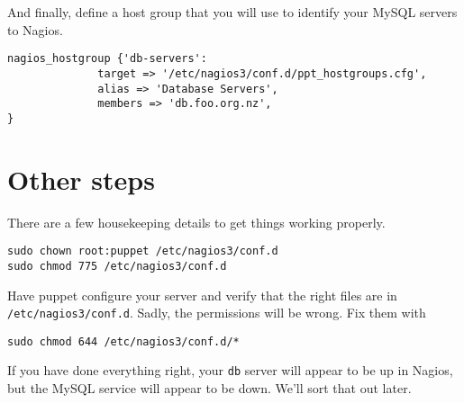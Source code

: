 \documentclass{article}         %
\begin{document}
And finally, define a host group that you will use to 
identify your MySQL servers to Nagios.

\begin{verbatim}
nagios_hostgroup {'db-servers':
              target => '/etc/nagios3/conf.d/ppt_hostgroups.cfg',
              alias => 'Database Servers',
              members => 'db.foo.org.nz',
}

\end{verbatim}


\section{Other steps}

There are a few housekeeping details to get things working properly.

\begin{verbatim}
sudo chown root:puppet /etc/nagios3/conf.d
sudo chmod 775 /etc/nagios3/conf.d 
\end{verbatim}

Have puppet configure your server and verify that the right files are in 
\texttt{/etc/nagios3/conf.d}.  Sadly, the permissions will be wrong.  
Fix them with

\begin{verbatim}
sudo chmod 644 /etc/nagios3/conf.d/* 
\end{verbatim}

If you have done everything right, your \texttt{db} server will appear to be up in Nagios,
but the MySQL service will appear to be down. We'll sort that out later.
\end{document}
